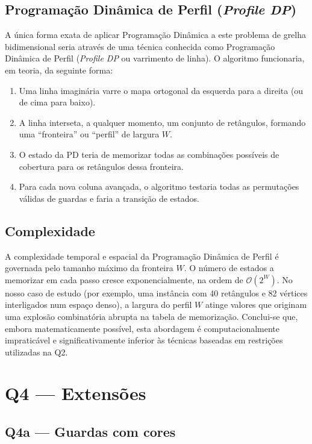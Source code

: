 \documentclass[11pt,a4paper]{article}
\begin{document}
\subsection{Programação Dinâmica de Perfil (\emph{Profile DP})}

A única forma exata de aplicar Programação Dinâmica a este problema de
grelha bidimensional seria através de uma técnica conhecida como
Programação Dinâmica de Perfil (\emph{Profile DP} ou varrimento de
linha). O algoritmo funcionaria, em teoria, da seguinte forma:

\begin{enumerate}[topsep=2pt,itemsep=0pt]
  \item Uma linha imaginária varre o mapa ortogonal da esquerda para a
    direita (ou de cima para baixo).
  \item A linha interseta, a qualquer momento, um conjunto de
    retângulos, formando uma ``fronteira'' ou ``perfil'' de largura
    $W$.
  \item O estado da PD teria de memorizar todas as combinações
    possíveis de cobertura para os retângulos dessa fronteira.
  \item Para cada nova coluna avançada, o algoritmo testaria todas as
    permutações válidas de guardas e faria a transição de estados.
\end{enumerate}

\subsection{Complexidade}

A complexidade temporal e espacial da Programação Dinâmica de Perfil é
governada pelo tamanho máximo da fronteira $W$. O número de estados a
memorizar em cada passo cresce exponencialmente, na ordem de
$\mathcal{O}(2^W)$. No nosso caso de estudo (por exemplo, uma
instância com 40 retângulos e 82 vértices interligados num espaço
denso), a largura do perfil $W$ atinge valores que originam uma
explosão combinatória abrupta na tabela de memorização. Conclui-se
que, embora matematicamente possível, esta abordagem é
computacionalmente impraticável e significativamente inferior às
técnicas baseadas em restrições utilizadas na Q2.


\section{Q4 --- Extensões}

\subsection{Q4a --- Guardas com cores}
\end{document}
